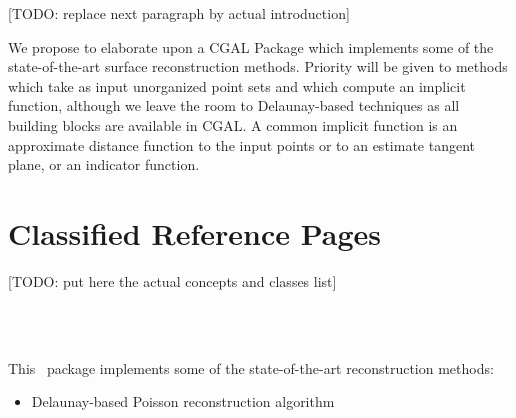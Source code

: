 



[TODO: replace next paragraph by actual introduction]

We propose to elaborate upon a CGAL Package which implements some
of the state-of-the-art surface reconstruction methods. Priority will
be given to methods which take as input unorganized point sets and
which compute an implicit function, although we leave the room to
Delaunay-based techniques as all building blocks are available in
CGAL. A common implicit function is an approximate distance function
to the input points or to an estimate tangent plane, or an indicator
function.


\section{Classified Reference Pages}

[TODO: put here the actual concepts and classes list]



  \\
  \\



This \cgal\ package implements some of
the state-of-the-art reconstruction methods:

\begin{itemize}

\item Delaunay-based Poisson reconstruction algorithm

\end{itemize}

